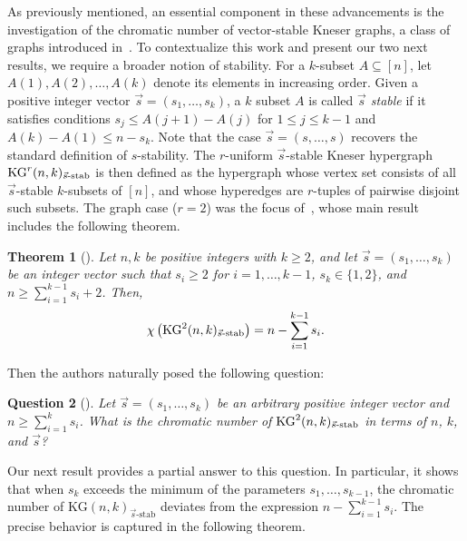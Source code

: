 \documentclass[preprint,12pt,3p]{elsarticle}
\newtheorem{theorem}{Theorem}
\newtheorem{question}[theorem]{Question}
\begin{document}
As previously mentioned, an essential component in these advancements is the investigation of the chromatic number of vector-stable Kneser graphs, a class of graphs introduced in~\cite{daneshpajouh2021neighborhood}. To contextualize this work and present our two next results, we require a broader notion of stability. For a $k$-subset $A \subseteq [n]$, let $A(1), A(2), \ldots, A(k)$ denote its elements in increasing order. Given a positive integer vector $\vec{s} = (s_1, \ldots, s_k)$, a $k$ subset $A$ is called \textit{$\vec{s}$ stable} if it satisfies conditions $s_j \leq A(j+1) - A(j)$ for $1 \leq j \leq k-1$ and $A(k) - A(1) \leq n - s_k$. Note that the case $\vec{s} = (s, \ldots, s)$ recovers the standard definition of $s$-stability. The $r$-uniform $\vec{s}$-stable Kneser hypergraph $\mathrm{KG}^r(n,k)_{\vec{s}\textup{-stab}}$ is then defined as the hypergraph whose vertex set consists of all $\vec{s}$-stable $k$-subsets of $[n]$, and whose hyperedges are $r$-tuples of pairwise disjoint such subsets. The graph case ($r=2$) was the focus of~\cite{daneshpajouh2021neighborhood}, whose main result includes the following theorem.

\begin{theorem}[{\cite[Theorem 4]{daneshpajouh2021neighborhood}}]\label{Theorem: Main of Hamid & Jozsef}
Let $n, k$ be positive integers with $k \geq 2$, and let $\vec{s} = (s_1, \ldots, s_k)$ be an integer vector such that $s_i \geq 2$ for $i = 1, \ldots, k-1$, $s_k \in \{1,2\}$, and $n \geq \sum_{i=1}^{k-1} s_i + 2$. Then,
	\[
	\chi\left(\mathrm{KG}^{2}(n, k)_{\vec{s}\textup{-stab}}\right) = n - \sum_{i=1}^{k-1} s_i.
	\] 
\end{theorem}

Then the authors naturally posed the following question:

\begin{question}[{\cite[Question 16]{daneshpajouh2021neighborhood}}]\label{Question: Main of Hamid & Jozsef}
Let $\vec{s} = (s_1, \ldots, s_k)$ be an arbitrary positive integer vector and $n \geq \sum_{i=1}^{k} s_i$. What is the chromatic number of $\mathrm{KG}^{2}(n, k)_{\vec{s}\textup{-stab}}$ in terms of $n$, $k$, and $\vec{s}$?
\end{question}

Our next result provides a partial answer to this question. In particular, it shows that when $s_k$ exceeds the minimum of the parameters $s_1, \ldots, s_{k-1}$, the chromatic number of $\mathrm{KG}(n,k)_{\vec{s}\text{-stab}}$ deviates from the expression $n - \sum_{i=1}^{k-1} s_i$. The precise behavior is captured in the following theorem.
\end{document}
